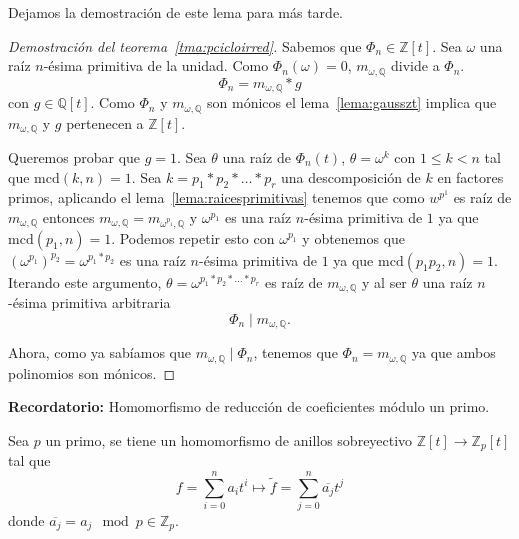 \documentclass[10pt, spanish]{report}
\theoremstyle{definition}
\theoremstyle{custom}
\theoremstyle{remark}
\newcommand{\Z}{\mathbb{Z}}
\newcommand{\Q}{\mathbb{Q}}
\newcommand{\mcd}[1]{\text{mcd}(#1)}
\renewcommand{\leq}{\leqslant}
\begin{document}
Dejamos la demostración de este lema para más tarde.

\begin{proof}[Demostración del teorema~\ref{tma:pcicloirred}]
    Sabemos que $\Phi_n\in\Z[t]$. Sea $\omega$ una raíz $n$-ésima primitiva de
    la unidad. Como $\Phi_n(\omega)=0$, $m_{\omega,\Q}$ divide a $\Phi_n$.
    \[\Phi_n=m_{\omega,\Q}*g\] con $g\in\Q[t]$.
    Como $\Phi_n$ y $m_{\omega,\Q}$ son mónicos el lema~\ref{lema:gausszt}
    implica que $m_{\omega,\Q}$ y $g$ pertenecen a $\Z[t]$.   

    Queremos probar que $g=1$. Sea $\theta$ una raíz de $\Phi_n(t)$,
    $\theta=\omega^k$ con $1\leq k<n$ tal que $\mcd{k,n}=1$. Sea
    $k=p_1*p_2*\ldots*p_r$ una descomposición de $k$ en factores primos,
    aplicando el lema~\ref{lema:raicesprimitivas} tenemos que como $w^{p^1}$ es raíz
    de $m_{\omega,\Q}$ entonces $m_{\omega,\Q}=m_{\omega^{p_1},\Q}$ y
    $\omega^{p_1}$ es una raíz $n$-ésima primitiva de $1$ ya que
    $\mcd{p_1,n}=1$. Podemos repetir esto con $\omega^{p_1}$ y obtenemos que
    ${(\omega^{p_1})}^{p_2}=\omega^{p_1*p_2}$ es una raíz $n$-ésima
    primitiva de $1$ ya que $\mcd{p_1 p_2,n}=1$. Iterando este argumento,
    $\theta=\omega^{p_1*p_2*\ldots*p_r}$ es raíz de $m_{\omega, \Q}$ y al ser
    $\theta$ una raíz $n$-ésima primitiva arbitraria
    \[\Phi_n\mid m_{\omega,\Q}.\]

    Ahora, como ya sabíamos que $m_{\omega,\Q}\mid \Phi_n$, tenemos que
    $\Phi_n=m_{\omega,\Q}$ ya que ambos polinomios son mónicos.
\end{proof}

\textbf{Recordatorio: }Homomorfismo de reducción de coeficientes módulo un
primo.

Sea $p$ un primo, se tiene un homomorfismo de anillos sobreyectivo $\Z[t]\to
\Z_p[t]$ tal que \[f=\sum_{i=0}^na_it^i\mapsto
\tilde{f}=\sum_{j=0}^n\overline{a_j}t^j\]     
donde $\overline{a_j}=a_j\mod p \in\Z_p$. 
\end{document}
